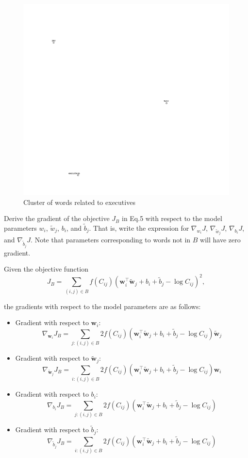 \documentclass[a4paper,10pt]{article}
\begin{document}
\begin{figure}[H]
    \centering
    \includegraphics[width=0.5\linewidth]{exec.png}
    \caption{Cluster of words related to executives}
    \label{fig:enter-label}
\end{figure}
\vspace{5pt}

\vspace{5pt}
\begin{taskbox}
 Derive the gradient of the objective $J_B$ in Eq.5 with respect to the model parameters $w_i$, $\tilde{w}_j$, $b_i$, and $\tilde{b}_j$. That is, write the expression for $\nabla_{w_i}J$, $\nabla_{\tilde{w}_j}J$, $\nabla_{b_i}J$, and $\nabla_{\tilde{b}_j}J$. Note that parameters corresponding to words not in $B$ will have zero gradient. 
\end{taskbox} 
\begin{answerbox}
    Given the objective function
\[
J_B = \sum_{(i,j)\in B} f(C_{ij}) \left( \mathbf{w}_i^\top \mathbf{\tilde{w}}_j + b_i + \tilde{b}_j - \log C_{ij} \right)^2,
\]

the gradients with respect to the model parameters are as follows:

\begin{itemize}
    \item Gradient with respect to \( \mathbf{w}_i \):
    \[
    \nabla_{\mathbf{w}_i} J_B = \sum_{j:(i,j)\in B} 2f(C_{ij}) \left( \mathbf{w}_i^\top \mathbf{\tilde{w}}_j + b_i + \tilde{b}_j - \log C_{ij} \right) \mathbf{\tilde{w}}_j
    \]
    
    \item Gradient with respect to \( \mathbf{\tilde{w}}_j \):
    \[
    \nabla_{\mathbf{\tilde{w}}_j} J_B = \sum_{i:(i,j)\in B} 2f(C_{ij}) \left( \mathbf{w}_i^\top \mathbf{\tilde{w}}_j + b_i + \tilde{b}_j - \log C_{ij} \right) \mathbf{w}_i
    \]
    
    \item Gradient with respect to \( b_i \):
    \[
    \nabla_{b_i} J_B = \sum_{j:(i,j)\in B} 2f(C_{ij}) \left( \mathbf{w}_i^\top \mathbf{\tilde{w}}_j + b_i + \tilde{b}_j - \log C_{ij} \right)
    \]
    
    \item Gradient with respect to \( \tilde{b}_j \):
    \[
    \nabla_{\tilde{b}_j} J_B = \sum_{i:(i,j)\in B} 2f(C_{ij}) \left( \mathbf{w}_i^\top \mathbf{\tilde{w}}_j + b_i + \tilde{b}_j - \log C_{ij} \right)
    \]
\end{itemize}

\end{answerbox}
\vspace{5pt}
\end{document}
